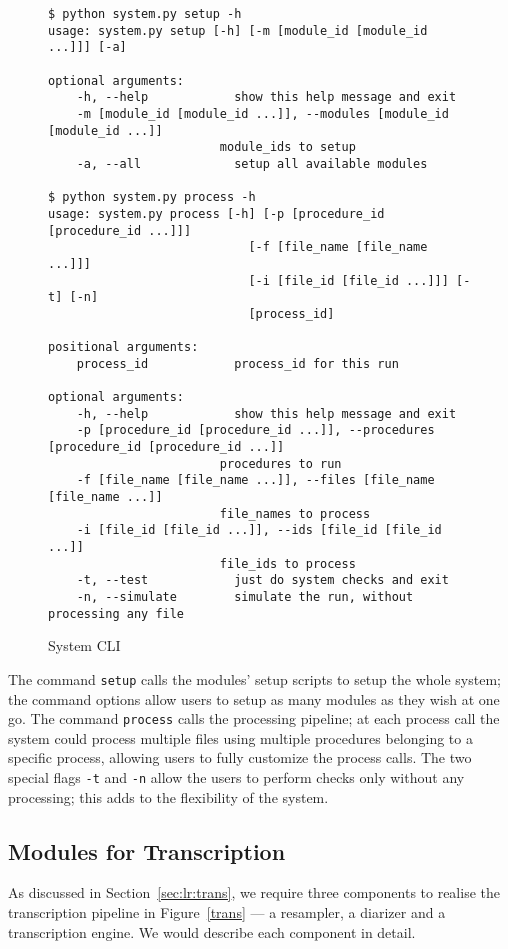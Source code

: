 \begin{figure}[ht]
\begin{lstlisting}
$ python system.py setup -h
usage: system.py setup [-h] [-m [module_id [module_id ...]]] [-a]

optional arguments:
    -h, --help            show this help message and exit
    -m [module_id [module_id ...]], --modules [module_id [module_id ...]]
                        module_ids to setup
    -a, --all             setup all available modules

$ python system.py process -h
usage: system.py process [-h] [-p [procedure_id [procedure_id ...]]]
                            [-f [file_name [file_name ...]]]
                            [-i [file_id [file_id ...]]] [-t] [-n]
                            [process_id]

positional arguments:
    process_id            process_id for this run

optional arguments:
    -h, --help            show this help message and exit
    -p [procedure_id [procedure_id ...]], --procedures [procedure_id [procedure_id ...]]
                        procedures to run
    -f [file_name [file_name ...]], --files [file_name [file_name ...]]
                        file_names to process
    -i [file_id [file_id ...]], --ids [file_id [file_id ...]]
                        file_ids to process
    -t, --test            just do system checks and exit
    -n, --simulate        simulate the run, without processing any file
\end{lstlisting}
\caption{System CLI}\label{args}
\end{figure}

The command \texttt{setup} calls the modules' setup scripts to setup the
whole system; the command options allow users to setup as many modules
as they wish at one go. The command \texttt{process} calls the processing
pipeline; at each process call the system could process multiple files
using multiple procedures belonging to a specific process, allowing users
to fully customize the process calls. The two special flags \texttt{-t} and
\texttt{-n} allow the users to perform checks only without any processing;
this adds to the flexibility of the system. 

\subsection{Modules for Transcription}\label{sec:im:code:trans}

As discussed in Section~\ref{sec:lr:trans}, we require three components
to realise the transcription pipeline in Figure~\ref{trans} --- a resampler,
a diarizer and a transcription engine. We would describe each component in
detail.

